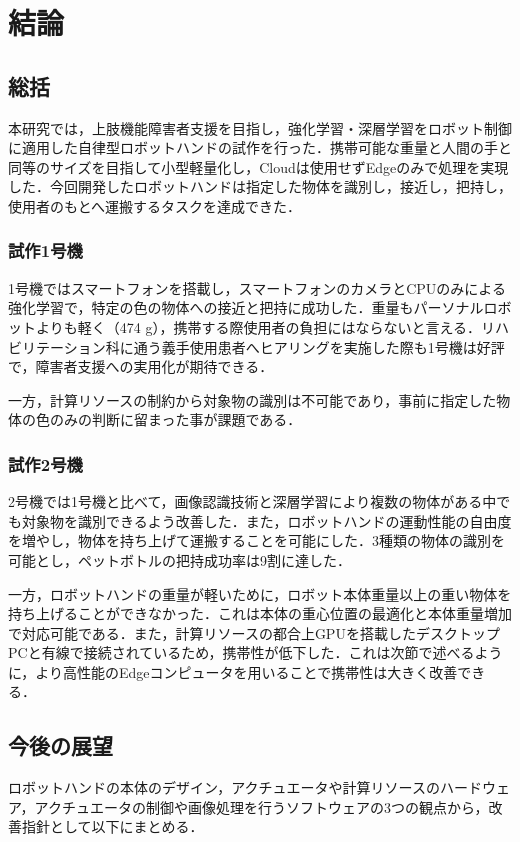 \chapter{結論}
\newpage

\section{総括}
本研究では，上肢機能障害者支援を目指し，強化学習・深層学習をロボット制御に適用した自律型ロボットハンドの試作を行った．携帯可能な重量と人間の手と同等のサイズを目指して小型軽量化し，Cloudは使用せずEdgeのみで処理を実現した．今回開発したロボットハンドは指定した物体を識別し，接近し，把持し，使用者のもとへ運搬するタスクを達成できた．

\subsection*{試作1号機}
1号機ではスマートフォンを搭載し，スマートフォンのカメラとCPUのみによる強化学習で，特定の色の物体への接近と把持に成功した．重量もパーソナルロボットよりも軽く（474 g），携帯する際使用者の負担にはならないと言える．リハビリテーション科に通う義手使用患者へヒアリングを実施した際も1号機は好評で，障害者支援への実用化が期待できる．

一方，計算リソースの制約から対象物の識別は不可能であり，事前に指定した物体の色のみの判断に留まった事が課題である．

\subsection*{試作2号機}
2号機では1号機と比べて，画像認識技術と深層学習により複数の物体がある中でも対象物を識別できるよう改善した．また，ロボットハンドの運動性能の自由度を増やし，物体を持ち上げて運搬することを可能にした．3種類の物体の識別を可能とし，ペットボトルの把持成功率は9割に達した．

一方，ロボットハンドの重量が軽いために，ロボット本体重量以上の重い物体を持ち上げることができなかった．これは本体の重心位置の最適化と本体重量増加で対応可能である．また，計算リソースの都合上GPUを搭載したデスクトップPCと有線で接続されているため，携帯性が低下した．これは次節で述べるように，より高性能のEdgeコンピュータを用いることで携帯性は大きく改善できる．


\section{今後の展望}\label{sec:今後の展望}
ロボットハンドの本体のデザイン，アクチュエータや計算リソースのハードウェア，アクチュエータの制御や画像処理を行うソフトウェアの3つの観点から，改善指針として以下にまとめる．

